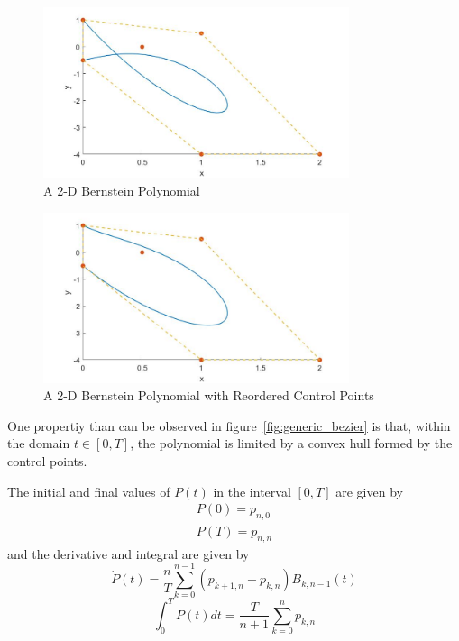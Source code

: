 \begin{figure}[h!]
\centering
\includegraphics[width=0.8\textwidth]{Images/generic_bezier2D.jpg}
\caption{A 2-D Bernstein Polynomial}
\label{fig:generic_bezier2D}
\end{figure}

\begin{figure}[h!]
\centering
\includegraphics[width=0.8\textwidth]{Images/generic_bezier2D_reordered.jpg}
\caption{A 2-D Bernstein Polynomial with Reordered Control Points}
\label{fig:generic_bezier2D_reordered}
\end{figure}


\par One propertiy than can be observed in figure~\ref{fig:generic_bezier} is that, within the domain $t \in [0,T]$, the polynomial is limited by a convex hull \cite{cichella2018bernstein} formed by the control points.
\par The initial and final values of $P(t)$ in the interval $[0,T]$ are given by
\begin{equation}
    \label{eq:bern_in_fin}
    \begin{gathered}
        P(0) = p_{n,0} \\
        P(T) = p_{n,n}
    \end{gathered}
\end{equation}
and the derivative and integral are given by 
\begin{equation}
    \label{eq:bern_deriv}
    \dot{P}(t) = \frac{n}{T} \sum_{k=0}^{n-1} (p_{k+1,n} - p_{k,n}) B_{k,n-1}(t)
\end{equation}
\begin{equation}
    \label{eq:bern_int}
    \int_0^T P(t)dt = \frac{T}{n+1} \sum_{k=0}^{n} p_{k,n}
\end{equation}

